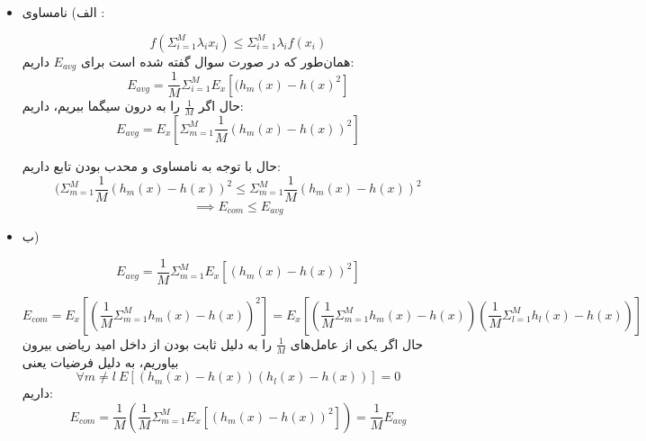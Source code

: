 
\begin{itemize}
	\item الف)
	نامساوی :
	
	$$
	f(\Sigma_{i = 1}^M\lambda_i x_i) \leq \Sigma_{i = 1}^M\lambda_if(x_i)
	$$
	همان‌طور که در صورت سوال گفته شده است برای $E_{avg}$ داریم:
	$$
	E_{avg} = \frac{1}{M} \Sigma_{i = 1}^{M}E_x[(h_m(x) - h(x)^2]
	$$
	حال اگر $\frac{1}{M}$ را به درون سیگما ببریم، داریم:
	$$
	E_{avg} = E_x[\Sigma_{m=1}^M  \frac{1}{M}(h_m(x) - h(x))^2]
	$$
	
	حال با توجه به نامساوی  و محدب بودن تابع داریم:
	$$
	(\Sigma_{m=1}^M\frac{1}{M}(h_m(x) - h(x))^2 \leq \Sigma_{m=1}^M\frac{1}{M}(h_m(x) - h(x))^2
	$$
	$$
	\implies E_{com} \leq E_{avg}
	$$
	\item ب)
	
	$$
	E_{avg} = \frac{1}{M} \Sigma_{m=1}^M E_x[(h_m(x) - h(x))^2]
	$$
	
	$$
	E_{com} = E_x[(\frac{1}{M} \Sigma_{m=1}^M h_m(x) - h(x))^2] = E_x[(\frac{1}{M} \Sigma_{m=1}^M h_m(x) - h(x)) (\frac{1}{M} \Sigma_{l=1}^M h_l(x) - h(x))]
	$$
	حال اگر یکی از عامل‌های $\frac{1}{M}$ را به دلیل ثابت بودن از داخل امید ریاضی بیرون بیاوریم، به دلیل فرضیات یعنی
	 $$
	 \forall m \neq l \: E[(h_m(x) - h(x))(h_l(x)-h(x))] = 0
	 $$
	 داریم:
	 $$
	 E_{com} = \frac{1}{M}(\frac{1}{M} \Sigma_{m=1}^M E_x[(h_m(x) - h(x))^2]) = \frac{1}{M}E_{avg}
	 $$
\end{itemize}
